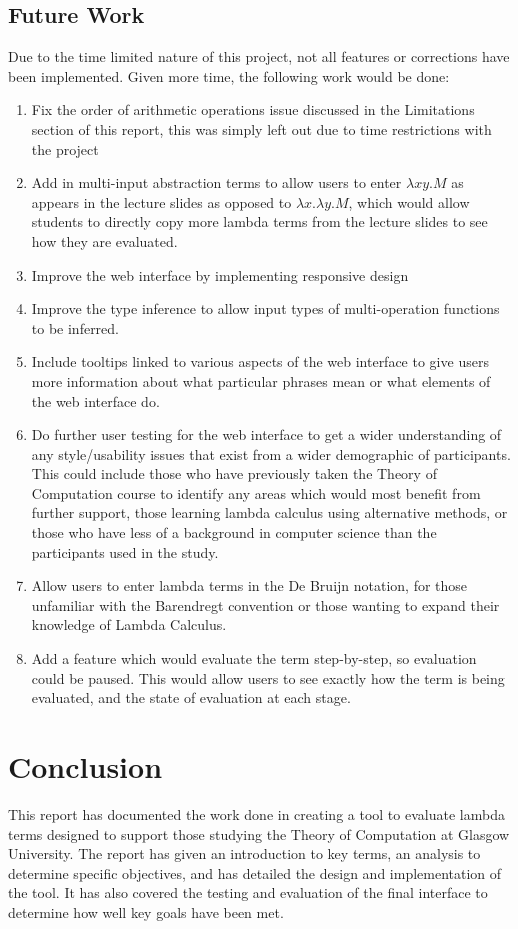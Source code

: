 \documentclass[a4paper,11pt]{report}
\begin{document}
\section{Future Work}
Due to the time limited nature of this project, not all features or corrections have been implemented. Given more time, the following work would be done:

\begin{enumerate}
	\item Fix the order of arithmetic operations issue discussed in the Limitations section of this report, this was simply left out due to time restrictions with the project
	\item Add in multi-input abstraction terms to allow users to enter $\lambda xy.M$ as appears in the lecture slides \cite{Gay2019} as opposed to $\lambda x.\lambda y.M$, which would allow students to directly copy more lambda terms from the lecture slides to see how they are evaluated.
	\item Improve the web interface by implementing responsive design
	\item Improve the type inference to allow input types of multi-operation functions to be inferred.
	\item Include tooltips linked to various aspects of the web interface to give users more information about what particular phrases mean or what elements of the web interface do.
	\item Do further user testing for the web interface to get a wider understanding of any style/usability issues that exist from a wider demographic of participants. This could include those who have previously taken the Theory of Computation course to identify any areas which would most benefit from further support, those learning lambda calculus using alternative methods, or those who have less of a background in computer science than the participants used in the study.
	\item Allow users to enter lambda terms in the De Bruijn notation, for those unfamiliar with the Barendregt convention or those wanting to expand their knowledge of Lambda Calculus.
	\item Add a feature which would evaluate the term step-by-step, so evaluation could be paused. This would allow users to see exactly how the term is being evaluated, and the state of evaluation at each stage.
\end{enumerate}

\chapter{Conclusion}
This report has documented the work done in creating a tool to evaluate lambda terms designed to support those studying the Theory of Computation at Glasgow University. The report has given an introduction to key terms, an analysis to determine specific objectives, and has detailed the design and implementation of the tool. It has also covered the testing and evaluation of the final interface to determine how well key goals have been met.\\
\end{document}
